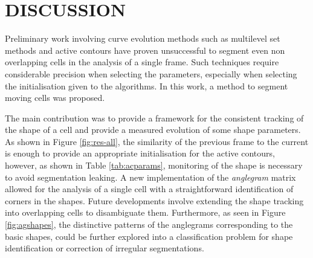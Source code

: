 \vspace{-1em}
\section{DISCUSSION}\label{sec:discussion}
\vspace{-0.25em}
Preliminary work involving curve evolution methods such as multilevel set
methods \cite{lu2015} and active contours \cite{chanvese} have proven unsuccessful
to segment even non overlapping cells in the analysis of a single frame.
Such techniques require considerable precision when selecting the parameters,
especially when selecting the initialisation given to the algorithms.
In this work, a method to segment moving cells
was proposed.

The main contribution was to provide a framework for the consistent tracking of
the shape of a cell and provide a measured evolution of some shape parameters.
As shown in Figure \ref{fig:res-all}, the similarity of the previous frame to the
current is enough to provide an appropriate initialisation for the active
contours, however, as shown in Table \ref{tab:acparams}, monitoring of the shape
is necessary to avoid segmentation leaking.
A new implementation of the \emph{anglegram} matrix allowed for the analysis
of a single cell with a straightforward identification of corners in the shapes.
Future developments involve extending the shape tracking into overlapping cells
to disambiguate them.
Furthermore, as seen in Figure \ref{fig:agshapes}, the distinctive patterns of
the anglegrams corresponding to the basic shapes, could be further explored
into a classification problem for shape identification or correction of
irregular segmentations.
\vspace{-0.5em}
